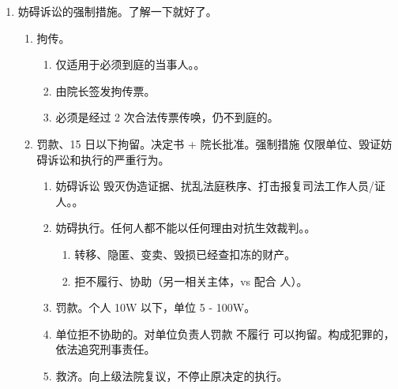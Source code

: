\begin{enumerate}
  \item 妨碍诉讼的强制措施。了解一下就好了。
        \begin{enumerate}
          \item 拘传。
                \begin{enumerate}
                  \item 仅适用于必须到庭的当事人。。
                  \item 由院长签发拘传票。
                  \item 必须是经过 2 次合法传票传唤，仍不到庭的。
                \end{enumerate}
          \item 罚款、15 日以下拘留。决定书 + 院长批准。强制措施 \yjt 仅限单位、毁证妨碍诉讼和执行的严重行为。
                \begin{enumerate}
                  \item 妨碍诉讼 \yjt 毁灭伪造证据、扰乱法庭秩序、打击报复司法工作人员/证人。。
                  \item 妨碍执行。任何人都不能以任何理由对抗生效裁判。。
                        \begin{enumerate}
                          \item 转移、隐匿、变卖、毁损已经查扣冻的财产。
                          \item 拒不履行、协助（另一相关主体，vs 配合 \yjt 人）。
                        \end{enumerate}
                  \item 罚款。个人 10W 以下，单位 5 - 100W。
                  \item 单位拒不协助的。对单位负责人罚款 \yjt 不履行 \yjt 可以拘留。构成犯罪的，依法追究刑事责任。
                  \item 救济。向上级法院复议，不停止原决定的执行。
                \end{enumerate}
        \end{enumerate}
\end{enumerate}
